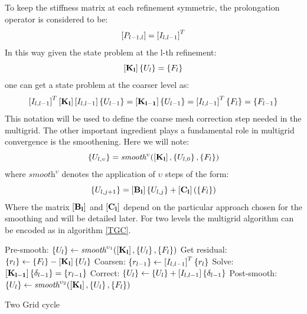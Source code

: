  To keep the stiffness matrix at each refinement symmetric, the prolongation operator is considered to be:
 \begin{equation}
 \left[{P_{l-1,l}}\right]=\left[{I_{l,l-1}}\right]^T
 \end{equation}
 In this way given the state problem at the l-th refinement:
 \begin{equation}
 \left[{\mathbf{K_{l}}}\right]\left\lbrace{U_{l}}\right \rbrace=\left\lbrace{F_{l}}\right \rbrace
 \end{equation}
 one can get a state problem at the coarser level as:
  \begin{equation}
  \left[{I_{l,l-1}}\right]^T \left[{\mathbf{K_{l}}}\right]\left[{I_{l,l-1}}\right]\left\lbrace{U_{l-1}}\right \rbrace=\left[{\mathbf{K_{l-1}}}\right]\left\lbrace{U_{l-1}}\right \rbrace=\left[{I_{l,l-1}}\right]^T\left\lbrace{F_{l}}\right \rbrace=\left\lbrace{F_{l-1}}\right \rbrace
  \end{equation}
  This notation will be used to define the coarse mesh correction step needed in the multigrid. The other important ingredient plays a fundamental role in multigrid convergence is the smoothening.
  Here we will note:
  \begin{equation}
 \left\lbrace{U_{l,\upsilon}}\right \rbrace=\textit{smooth}^{\upsilon}(\left[{\mathbf{K_{l}}}\right],\left\lbrace{U_{l,0}}\right \rbrace,\left\lbrace{F_{l}}\right \rbrace)
  \end{equation}
  where $\textit{smooth}^{\upsilon}$ denotes the application of $\upsilon$ steps of the form:
  \begin{equation}
 \left\lbrace{ U_{l,j+1}}\right \rbrace= \left[{\mathbf{B_{l}}}\right]\left\lbrace{U_{l,j}}\right \rbrace+\left[{\mathbf{C_{l}}}\right]\left(\left\lbrace{F_{l}}\right \rbrace\right)
  \end{equation}
  Where the matrix $\left[{\mathbf{B_{l}}}\right]$ and $\left[{\mathbf{C_{l}}}\right]$ depend on the particular approach chosen for the smoothing and will be detailed later. For two levels the multigrid algorithm can be encoded as in algorithm \ref{TGC}.
  \begin{algorithm}
 Pre-smooth: $\left\lbrace{U_{l}}\right \rbrace\gets\textit{smooth}^{\upsilon_1}(\left[{\mathbf{K_{l}}}\right],\left\lbrace{U_{l}}\right \rbrace,\left\lbrace{F_{l}}\right \rbrace)$\;
 Get residual: $\left\lbrace{r_{l}}\right \rbrace\gets\left\lbrace{F_{l}}\right \rbrace-\left[{\mathbf{K_{l}}}\right]\left\lbrace{U_{l}}\right \rbrace$\;
 Coarsen: $\left\lbrace{r_{l-1}}\right \rbrace\gets\left[{I_{l,l-1}}\right]^T\left\lbrace{r_{l}}\right \rbrace$\;
 Solve: $\left[{\mathbf{K_{l-1}}}\right]\left\lbrace{\delta_{l-1}}\right \rbrace=\left\lbrace{r_{l-1}}\right \rbrace$\;
 Correct: $\left\lbrace{U_{l}}\right \rbrace\gets\left\lbrace{U_{l}}\right \rbrace+\left[{I_{l,l-1}}\right]\left\lbrace{\delta_{l-1}}\right \rbrace$\;
 Post-smooth: $\left\lbrace{U_{l}}\right \rbrace\gets\textit{smooth}^{\upsilon_2}(\left[{\mathbf{K_{l}}}\right],\left\lbrace{U_{l}}\right \rbrace,\left\lbrace{F_{l}}\right \rbrace)$\;
   \caption{Two Grid cycle \label{TGC}}
  \end{algorithm}
